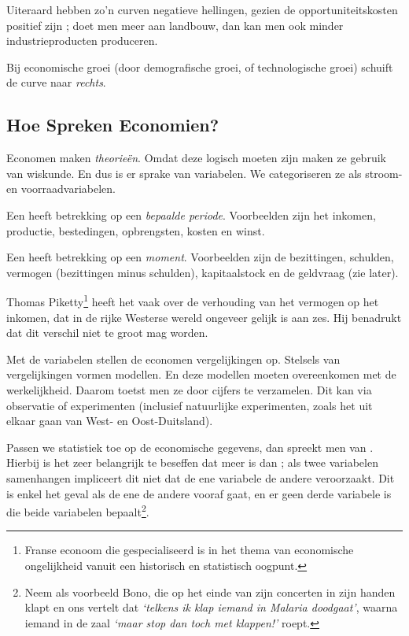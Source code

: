 Uiteraard hebben zo'n curven negatieve hellingen, gezien de opportuniteitskosten positief zijn ; doet men meer aan landbouw, dan kan men ook minder industrieproducten produceren.
\par Bij economische groei (door demografische groei, of technologische groei) schuift de curve naar \textit{rechts}.

\subsection{Hoe Spreken Economien?}

Economen maken \textit{theorie\"en}. Omdat deze logisch moeten zijn maken ze gebruik van wiskunde. En dus is er sprake van variabelen. We categoriseren ze als stroom- en voorraadvariabelen.\\

\par Een  heeft betrekking op een \textit{bepaalde periode}. Voorbeelden zijn het inkomen, productie, bestedingen, opbrengsten, kosten en winst.
\par Een  heeft betrekking op een \textit{moment}. Voorbeelden zijn de bezittingen, schulden, vermogen (bezittingen minus schulden), kapitaalstock en de geldvraag (zie later).
\par Thomas Piketty\footnote{Franse econoom die gespecialiseerd is in het thema van economische ongelijkheid vanuit een historisch en statistisch oogpunt.} heeft het vaak over de verhouding van het vermogen op het inkomen, dat in de rijke Westerse wereld ongeveer gelijk is aan zes. Hij benadrukt dat dit verschil niet te groot mag worden.\\

\par Met de variabelen stellen de economen vergelijkingen op. Stelsels van vergelijkingen vormen modellen. En deze modellen moeten overeenkomen met de werkelijkheid. Daarom toetst men ze door cijfers te verzamelen. Dit kan via observatie of experimenten (inclusief natuurlijke experimenten, zoals het uit elkaar gaan van West- en Oost-Duitsland).
\par Passen we statistiek toe op de economische gegevens, dan spreekt men van . Hierbij is het zeer belangrijk te beseffen dat  meer is dan  ; als twee variabelen samenhangen impliceert dit niet dat de ene variabele de andere veroorzaakt. Dit is enkel het geval als de ene de andere vooraf gaat, en er geen derde variabele is die beide variabelen bepaalt\footnote{Neem als voorbeeld Bono, die op het einde van zijn concerten in zijn handen klapt en ons vertelt dat \textit{`telkens ik klap iemand in Malaria doodgaat'}, waarna iemand in de zaal \textit{`maar stop dan toch met klappen!'} roept.}.\\

